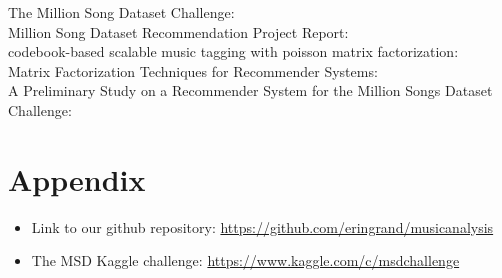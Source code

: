 \documentclass[12pt,preprint]{aastex}
\begin{document}
The Million Song Dataset Challenge: \citep{McFee:2012:MSD:2187980.2188222} \\
Million Song Dataset Recommendation Project Report: \citep{li2012million} \\
codebook-based scalable music tagging with poisson matrix factorization: \citep{liangcodebook} \\
Matrix Factorization Techniques for Recommender Systems: \citep{koren2009matrix} \\
A Preliminary Study on a Recommender System for the Million Songs Dataset Challenge: \citep{aiolli2013preliminary} \\





\small{
\section{Appendix}

\begin{itemize}

  \item Link to our github repository: \url{https://github.com/eringrand/musicanalysis}
  \item The MSD Kaggle challenge: \url{https://www.kaggle.com/c/msdchallenge}

\end{itemize}
}
\end{document}
